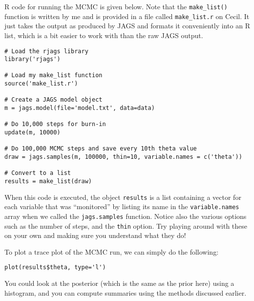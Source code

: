 R code for running the MCMC is given below. Note that the {\tt make\_list()}
function is written by me and is provided in a file called {\tt make\_list.r}
on Cecil. It just takes the output as produced by JAGS and formats it
conveniently into an R list, which is a bit easier to work with than the raw
JAGS output.

\begin{framed}
\begin{verbatim}
# Load the rjags library
library('rjags')

# Load my make_list function
source('make_list.r')

# Create a JAGS model object
m = jags.model(file='model.txt', data=data)

# Do 10,000 steps for burn-in
update(m, 10000)

# Do 100,000 MCMC steps and save every 10th theta value
draw = jags.samples(m, 100000, thin=10, variable.names = c('theta'))

# Convert to a list
results = make_list(draw)
\end{verbatim}
\end{framed}
When this code is executed, the object {\tt results} is a list containing a
vector for each variable that was ``monitored'' by listing its name in
the {\tt variable.names} array when we called the {\tt jags.samples} function.
Notice also the various options such as the number of steps, and the {\tt thin}
option. Try playing around with these on your own and making sure you understand
what they do!

To plot a trace plot of the MCMC run, we can simply do
the following:
\begin{framed}
\begin{verbatim}
plot(results$theta, type='l')
\end{verbatim}
\end{framed}
You could look at the posterior (which is the same as the prior here) using a
histogram, and you can compute summaries using the methods discussed earlier.

